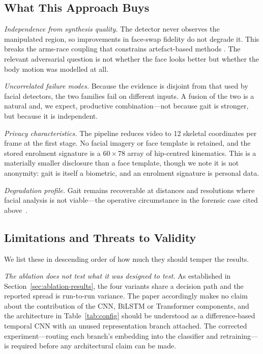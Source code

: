 \documentclass[journal]{IEEEtran}
\begin{document}
\subsection{What This Approach Buys}

\emph{Independence from synthesis quality.} The detector never observes the
manipulated region, so improvements in face-swap fidelity do not degrade it.
This breaks the arms-race coupling that constrains artefact-based methods
\cite{recce,altfreezing}. The relevant adversarial question is not whether the
face looks better but whether the body motion was modelled at all.

\emph{Uncorrelated failure modes.} Because the evidence is disjoint from that
used by facial detectors, the two families fail on different inputs. A fusion
of the two is a natural and, we expect, productive combination---not because
gait is stronger, but because it is independent.

\emph{Privacy characteristics.} The pipeline reduces video to 12 skeletal
coordinates per frame at the first stage. No facial imagery or face template is
retained, and the stored enrolment signature is a $60 \times 78$ array of
hip-centred kinematics. This is a materially smaller disclosure than a face
template, though we note it is not anonymity: gait is itself a biometric, and
an enrolment signature is personal data.

\emph{Degradation profile.} Gait remains recoverable at distances and
resolutions where facial analysis is not viable---the operative circumstance in
the forensic case cited above~\cite{forensic_gait}.

\subsection{Limitations and Threats to Validity}
\label{sec:threats}

We list these in descending order of how much they should temper the results.

\emph{The ablation does not test what it was designed to test.} As established
in Section~\ref{sec:ablation-results}, the four variants share a decision path
and the reported spread is run-to-run variance. The paper accordingly makes no
claim about the contribution of the CNN, BiLSTM or Transformer components, and
the architecture in Table~\ref{tab:config} should be understood as a
difference-based temporal CNN with an unused representation branch attached.
The corrected experiment---routing each branch's embedding into the classifier
and retraining---is required before any architectural claim can be made.
\end{document}
